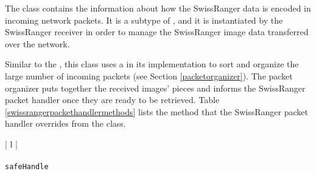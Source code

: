 The \SwissRangerPacketHandler{} class contains the information about how the Swiss\-Ranger data is encoded 
in incoming network packets. It is a subtype of \SafePacketHandler{}, and it is instantiated by the Swiss\-Ranger 
receiver in order to manage the Swiss\-Ranger image data transferred over the network.

Similar to the \ColorPacketHandler{}, this class uses a \PacketOrganizer{} in its implementation to sort and 
organize the large number of incoming packets (see Section \ref{packetorganizer}). The packet organizer puts 
together the received images' pieces and informs the SwissRanger packet handler once they are ready to be 
retrieved. Table \ref{swissrangerpackethandlermethods} lists the method that the SwissRanger packet handler 
overrides from the \SafePacketHandler{} class. 

\begin{table}[ht]
\caption{Public methods in the \SwissRangerPacketHandler{}}
\begin{center}
\begin{tabular}{| l |}
	\hline 
	 \\
	 \\
	\hline \hline
	\texttt{safeHandle} \\
	\hline
\end{tabular}
\end{center}
\label{swissrangerpackethandlermethods}
\end{table}